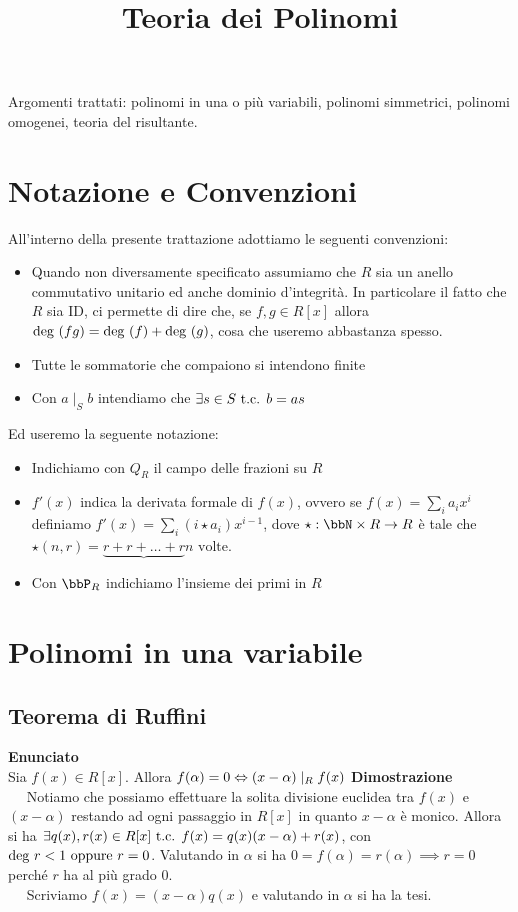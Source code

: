\documentclass[a4paper,NoNotes,GeneralMath]{stdmdoc}
\newcommand{\opp}{\text{ oppure }}
\newcommand{\Enunciato}{\vskip 0.05cm \noindent \textbf{Enunciato} \\ }
\renewcommand{\Dimostrazione}{\vskip 0.05cm \noindent \textbf{Dimostrazione} \\ }
\newcommand{\frdx}{ \framebox[\width]{ $\Rightarrow$ } }
\newcommand{\frsx}{ \framebox[\width]{ $\Leftarrow$ } }
\begin{document}
	\title{Teoria dei Polinomi}
	Argomenti trattati: polinomi in una o più variabili, polinomi simmetrici, polinomi omogenei, teoria del risultante.

	\section*{Notazione e Convenzioni}
	All'interno della presente trattazione adottiamo le seguenti convenzioni:
	\begin{itemize}
		\item Quando non diversamente specificato assumiamo che $R$ sia un anello commutativo unitario ed anche dominio d'integrità. In particolare il fatto che $R$ sia ID, ci permette di dire che, se $f,g \in R[x]$ allora $\mbox{deg }(fg) = \mbox{deg }(f) + \mbox{deg }(g)$, cosa che useremo abbastanza spesso.
		\item Tutte le sommatorie che compaiono si intendono finite
		\item Con $a \mid_S b$ intendiamo che $\exists s \in S \mbox{ t.c. } b = as$
	\end{itemize} \vskip 0.2cm

	Ed useremo la seguente notazione:
	\begin{itemize}
		\item Indichiamo con $Q_R$ il campo delle frazioni su $R$
		\item $f'(x)$ indica la derivata formale di $f(x)$, ovvero se $f(x) = \sum_i a_i x^i$ definiamo $f'(x) = \sum_i (i\star a_i) x^{i-1}$, dove $\star: \bbN \times R \rar R$ è tale che $\star(n, r) = \underbrace{r + r + \ldots + r}{n \text{ volte}}$.
		\item Con $\bbP_R$ indichiamo l'insieme dei primi in $R$
	\end{itemize}

	\section*{Polinomi in una variabile}

	\subsection{Teorema di Ruffini}
	\Enunciato Sia $f(x) \in R[x]$. Allora $f(\alpha)=0 \Leftrightarrow (x-\alpha) \mid_R f(x)$
	\Dimostrazione \frdx $\quad $ Notiamo che possiamo effettuare la solita divisione euclidea tra $f(x)$ e $(x-\alpha)$ restando ad ogni passaggio in $R[x]$ in quanto $x-\alpha$ è monico. Allora si ha $\exists q(x), r(x) \in R[x] \mbox{ t.c. } f(x) = q(x)(x-\alpha) + r(x)$, con $\Deg r < 1 \opp r = 0$. Valutando in $\alpha$ si ha $0 = f(\alpha) = r(\alpha) \implies r = 0$ perché $r$ ha al più grado $0$. \\
		\frsx $\quad$ Scriviamo $f(x) = (x-\alpha)q(x)$ e valutando in $\alpha$ si ha la tesi.
	
\end{document}
